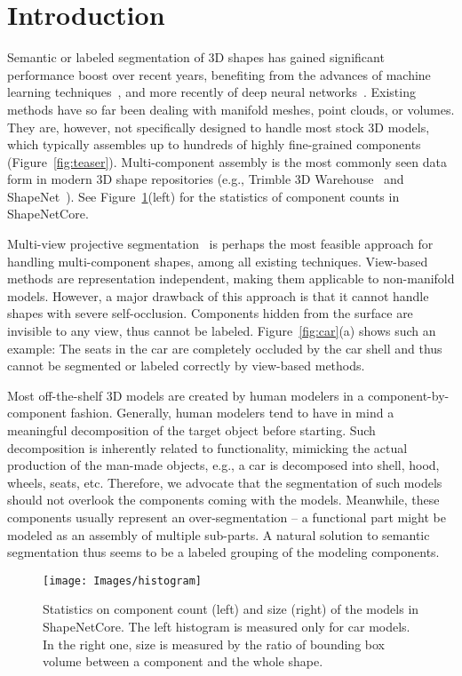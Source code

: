 \documentclass[acmtog]{acmart}
\newcommand{\new}[1]{{\color{black}#1}}
\begin{document}
\section{Introduction}
\new{Semantic or labeled segmentation of 3D shapes has gained significant performance boost
over recent years,
benefiting from the advances of machine learning techniques~\cite{Kalogerakis_SG10,Hu_SGP12},
and more recently of deep neural networks~\cite{Kalogerakis_CVPR17,Su_CVPR17}.
Existing methods have so far been dealing with manifold meshes, point clouds,
or volumes. They are, however, not specifically designed to handle most stock 3D models,
which typically assembles
up to hundreds of highly fine-grained components (Figure~\ref{fig:teaser}).
Multi-component assembly is the most commonly seen data form
in modern 3D shape repositories (e.g., Trimble 3D Warehouse~\cite{Tri3Dwarehouse} and ShapeNet~\cite{ShapeNet2015}).
See Figure~\ref{fig:shapenetstat}(left) for the statistics of component counts in ShapeNetCore.


Multi-view projective segmentation~\cite{Wang_SA13,Kalogerakis_CVPR17} is perhaps the most feasible approach
for handling multi-component shapes, among all existing techniques.
View-based methods are representation independent, making them applicable to non-manifold
models. However, a major drawback of this approach is
that it cannot handle shapes with severe self-occlusion.
Components hidden from the surface are invisible to any view,
thus cannot be labeled.
Figure~\ref{fig:car}(a) shows such an example: The seats in the car are completely occluded by
the car shell and thus cannot be segmented or labeled correctly by view-based methods.

Most off-the-shelf 3D models are created by human modelers in a component-by-component fashion.
Generally, human modelers tend to have in mind a meaningful decomposition of the target object before starting.
Such decomposition is inherently related to functionality, mimicking the actual production of the
man-made objects, e.g., a car is decomposed into shell, hood, wheels, seats, etc.
Therefore, we advocate that the segmentation of such models should not overlook the components
coming with the models.
Meanwhile, these components usually represent an over-segmentation -- a functional part
might be modeled as an assembly of multiple sub-parts.
A natural solution to semantic segmentation thus seems to be a labeled grouping of the modeling components.

\begin{figure}[t]
  \centering
  \texttt{[image: Images/histogram]}
  \caption{\new{Statistics on component count (left) and size (right) of the models in ShapeNetCore. The left histogram is measured only for car models. In the right one, size is measured by the ratio of bounding box volume between a component and the whole shape.}}
  \label{fig:shapenetstat}
\end{figure}



}
\end{document}
